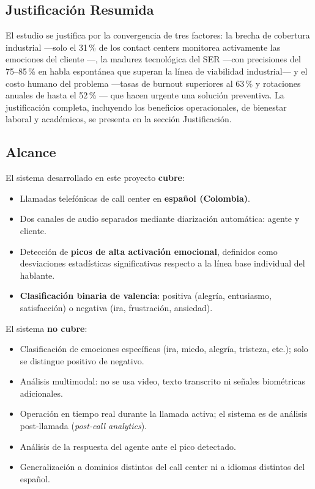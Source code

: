 \subsection{Justificación Resumida}
\label{sec:intro_justificacion}

El estudio se justifica por la convergencia de tres factores: la brecha de cobertura
industrial ---solo el 31\,\% de los contact centers monitorea activamente las emociones
del cliente \cite{zoom2025}---, la madurez tecnológica del SER ---con precisiones del
75--85\,\% en habla espontánea \cite{abdelhamid2022, wagner2023} que superan la línea
de viabilidad industrial--- y el costo humano del problema ---tasas de burnout
superiores al 63\,\% y rotaciones anuales de hasta el 52\,\% \cite{sqm2023,
hiringbranch2024}--- que hacen urgente una solución preventiva. La justificación
completa, incluyendo los beneficios operacionales, de bienestar laboral y académicos,
se presenta en la sección Justificación.

\subsection{Alcance}
\label{sec:intro_alcance}

El sistema desarrollado en este proyecto \textbf{cubre}:
\begin{itemize}
    \item Llamadas telefónicas de call center en \textbf{español (Colombia)}.
    \item Dos canales de audio separados mediante diarización automática: agente y
          cliente.
    \item Detección de \textbf{picos de alta activación emocional}, definidos como
          desviaciones estadísticas significativas respecto a la línea base individual
          del hablante.
    \item \textbf{Clasificación binaria de valencia}: positiva (alegría, entusiasmo,
          satisfacción) o negativa (ira, frustración, ansiedad).
\end{itemize}

El sistema \textbf{no cubre}:
\begin{itemize}
    \item Clasificación de emociones específicas (ira, miedo, alegría, tristeza, etc.);
          solo se distingue positivo de negativo.
    \item Análisis multimodal: no se usa video, texto transcrito ni señales
          biométricas adicionales.
    \item Operación en tiempo real durante la llamada activa; el sistema es de análisis
          post-llamada (\textit{post-call analytics}).
    \item Análisis de la respuesta del agente ante el pico detectado.
    \item Generalización a dominios distintos del call center ni a idiomas distintos
          del español.
\end{itemize}

